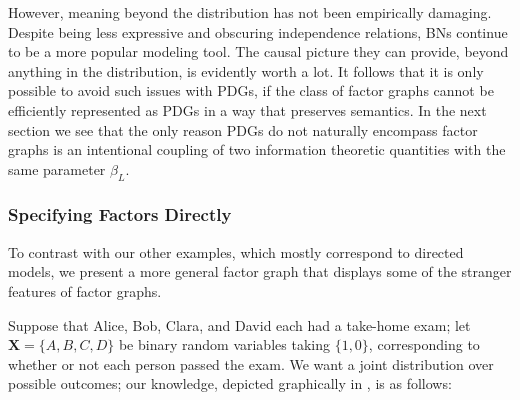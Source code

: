 {{	However, meaning beyond the distribution has not been empirically damaging. Despite being less expressive and obscuring independence relations, BNs continue to be a more popular modeling tool. The causal picture they can provide, beyond anything in the distribution, is evidently worth a lot.
}%
It follows that it is only possible to avoid such issues with PDGs, if the class of factor graphs cannot be efficiently represented as PDGs in a way that preserves semantics.
In the next section we see that the only reason PDGs do not naturally encompass factor graphs is an intentional coupling of two information theoretic quantities with the same parameter $\beta_L$. 
%

\subsubsection{Specifying Factors Directly}
%


	To contrast with our other examples, which mostly correspond to directed models, we present a more general factor graph that displays some of the stranger features of factor graphs.

\begin{example}\label{ex:fg-exam}		
		  Suppose that Alice, Bob, Clara, and David each had a
			take-home exam; let $\mathbf X = \{A, B, C, D\}$ be
			binary random variables taking $\{1,0\}$,
			corresponding to whether or not each person passed the
			exam.  
	We want a joint distribution over possible outcomes; our knowledge, depicted graphically in , is as follows:	

	\begin{figure}[H]
		\centering
\end{figure}
\end{example}}
